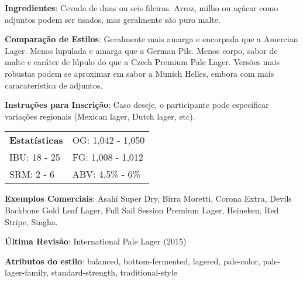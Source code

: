 \textbf{Ingredientes}: Cevada de duas ou seis fileiras. Arroz, milho ou açúcar como adjuntos podem ser usados, mas geralmente são puro malte.

\textbf{Comparação de Estilos}: Geralmente mais amarga e encorpada que a Amercian Lager. Menos lupulada e amarga que a German Pils. Menos corpo, sabor de malte e caráter de lúpulo do que a Czech Premium Pale Lager. Versões mais robustas podem se aproximar em sabor a Munich Helles, embora com mais caracaterística de adjuntos.

\textbf{Instruções para Inscrição}: Caso deseje, o participante pode especificar variações regionais (Mexican lager, Dutch lager, etc).

\begin{tabular}{@{}p{35mm}p{35mm}@{}}
  \textbf{Estatísticas} & OG: 1,042 - 1,050 \\
  IBU: 18 - 25  & FG: 1,008 - 1,012  \\
  SRM: 2 - 6   & ABV: 4,5\% - 6\%
\end{tabular}

\textbf{Exemplos Comerciais}: Asahi Super Dry, Birra Moretti, Corona Extra, Devils Backbone Gold Leaf Lager, Full Sail Session Premium Lager, Heineken, Red Stripe, Singha.

\textbf{Última Revisão}: International Pale Lager (2015)

\textbf{Atributos do estilo}: balanced, bottom-fermented, lagered, pale-color, pale-lager-family, standard-strength, traditional-style

